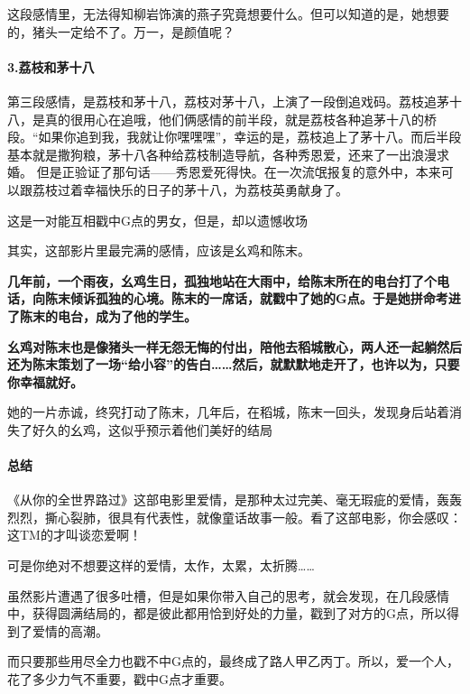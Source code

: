 \documentclass[UTF8,a4paper,8pt]{ctexart}
\begin{document}
 这段感情里，无法得知柳岩饰演的燕子究竟想要什么。但可以知道的是，她想要的，猪头一定给不了。万一，是颜值呢？
 
 \paragraph{3.荔枝和茅十八}
 第三段感情，是荔枝和茅十八，荔枝对茅十八，上演了一段倒追戏码。荔枝追茅十八，是真的很用心在追哦，他们俩感情的前半段，就是荔枝各种追茅十八的桥段。“如果你追到我，我就让你嘿嘿嘿”，幸运的是，荔枝追上了茅十八。而后半段基本就是撒狗粮，茅十八各种给荔枝制造导航，各种秀恩爱，还来了一出浪漫求婚。	
 但是正验证了那句话——秀恩爱死得快。在一次流氓报复的意外中，本来可以跟荔枝过着幸福快乐的日子的茅十八，为荔枝英勇献身了。
 
 这是一对能互相戳中G点的男女，但是，却以遗憾收场
 
 其实，这部影片里最完满的感情，应该是幺鸡和陈末。
 
 \textbf{几年前，一个雨夜，幺鸡生日，孤独地站在大雨中，给陈末所在的电台打了个电话，向陈末倾诉孤独的心境。陈末的一席话，就戳中了她的G点。于是她拼命考进了陈末的电台，成为了他的学生。}
 
 \textbf{幺鸡对陈末也是像猪头一样无怨无悔的付出，陪他去稻城散心，两人还一起躺然后还为陈末策划了一场“给小容”的告白……然后，就默默地走开了，也许以为，只要你幸福就好。}
 
 她的一片赤诚，终究打动了陈末，几年后，在稻城，陈末一回头，发现身后站着消失了好久的幺鸡，这似乎预示着他们美好的结局
 
 \paragraph{总结}
 《从你的全世界路过》这部电影里爱情，是那种太过完美、毫无瑕疵的爱情，轰轰烈烈，撕心裂肺，很具有代表性，就像童话故事一般。看了这部电影，你会感叹：这TM的才叫谈恋爱啊！
 
 可是你绝对不想要这样的爱情，太作，太累，太折腾……
 
 虽然影片遭遇了很多吐槽，但是如果你带入自己的思考，就会发现，在几段感情中，获得圆满结局的，都是彼此都用恰到好处的力量，戳到了对方的G点，所以得到了爱情的高潮。
 
 而只要那些用尽全力也戳不中G点的，最终成了路人甲乙丙丁。所以，爱一个人，花了多少力气不重要，戳中G点才重要。
\end{document}
